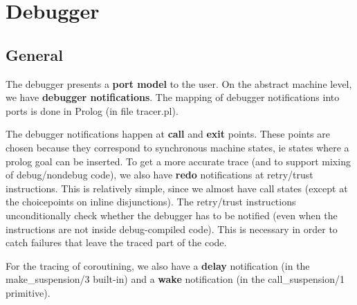 %
% 
% 
% 
% 
\section{Debugger}


\subsection{General}

The debugger presents a {\bf port model} to the user.
On the abstract machine level, we have {\bf debugger notifications}.
The mapping of debugger notifications into ports is done
in Prolog (in file tracer.pl).

The debugger notifications  happen at {\bf call} and {\bf exit} points.  These
points are chosen because they correspond to synchronous machine
states, ie states where a prolog goal can be inserted.  To get a more
accurate trace (and to support mixing of debug/nondebug code), we also
have {\bf redo} notifications at retry/trust instructions.
This is relatively simple, since we almost
have call states (except at the choicepoints on inline disjunctions).
The retry/trust instructions unconditionally check whether the debugger
has to be notified (even when the instructions are not inside debug-compiled
code). This is necessary in order to catch failures that leave the traced part
of the code.

For the tracing of coroutining, we also have a {\bf delay} notification
(in the make_suspension/3 built-in) and a {\bf wake} notification
(in the call_suspension/1 primitive).

